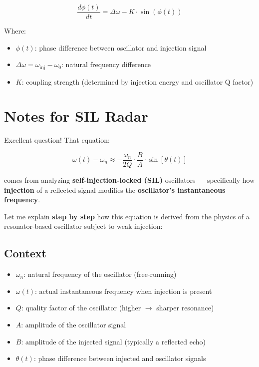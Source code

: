 \documentclass{article}
\begin{document}
\begin{equation}
\frac{d\phi(t)}{dt} = \Delta \omega - K \cdot \sin(\phi(t))
\end{equation}

Where:
\begin{itemize}
    \item $\phi(t)$: phase difference between oscillator and injection signal
    \item $\Delta \omega = \omega_{\text{inj}} - \omega_0$: natural frequency difference
    \item $K$: coupling strength (determined by injection energy and oscillator Q factor)
\end{itemize}

\section{Notes for SIL Radar}

Excellent question! That equation:

\begin{equation}
\omega(t) - \omega_n \approx -\frac{\omega_n}{2Q} \cdot \frac{B}{A} \cdot \sin[\theta(t)]
\end{equation}

comes from analyzing \textbf{self-injection-locked (SIL)} oscillators --- specifically how \textbf{injection} of a reflected signal modifies the \textbf{oscillator's instantaneous frequency}.

Let me explain \textbf{step by step} how this equation is derived from the physics of a resonator-based oscillator subject to weak injection:

\subsection{Context}

\begin{itemize}
    \item $\omega_n$: natural frequency of the oscillator (free-running)
    \item $\omega(t)$: actual instantaneous frequency when injection is present
    \item $Q$: quality factor of the oscillator (higher $\rightarrow$ sharper resonance)
    \item $A$: amplitude of the oscillator signal
    \item $B$: amplitude of the injected signal (typically a reflected echo)
    \item $\theta(t)$: phase difference between injected and oscillator signals
\end{itemize}
\end{document}
